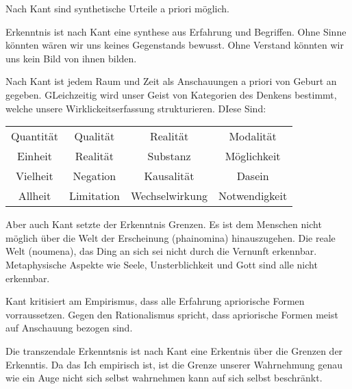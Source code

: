 \documentclass{article}
\begin{document}
Nach Kant sind synthetische Urteile a priori möglich.

Erkenntnis ist nach Kant eine synthese aus Erfahrung und Begriffen. Ohne Sinne könnten wären wir uns keines Gegenstands bewusst.
Ohne Verstand könnten wir uns kein Bild von ihnen bilden.

Nach Kant ist jedem Raum und Zeit als Anschauungen a priori von Geburt an gegeben. GLeichzeitig wird unser Geist von Kategorien des Denkens bestimmt,
welche unsere Wirklickeitserfassung strukturieren. DIese Sind:
\begin{center}
    \begin{tabular} {c c c c}
        Quantität & Qualität & Realität & Modalität \\
        Einheit & Realität & Substanz & Möglichkeit \\
        Vielheit & Negation & Kausalität & Dasein \\
        Allheit & Limitation & Wechselwirkung & Notwendigkeit
    \end{tabular}
\end{center}
Aber auch Kant setzte der Erkenntnis Grenzen. Es ist dem Menschen nicht möglich über die Welt der Erscheinung (phainomina) hinauszugehen.
Die reale Welt (noumena), das Ding an sich sei nicht durch die Vernunft erkennbar. Metaphysische Aspekte wie Seele, Unsterblichkeit und
Gott sind alle nicht erkennbar.

Kant kritisiert am Empirismus, dass alle Erfahrung apriorische Formen vorraussetzen. Gegen den Rationalismus spricht,
dass apriorische Formen meist auf Anschauung bezogen sind.

Die transzendale Erkenntsnis ist nach Kant eine Erkentnis über die Grenzen der Erkenntis. Da das Ich empirisch ist, ist die 
Grenze unserer Wahrnehmung genau wie ein Auge nicht sich selbst wahrnehmen kann auf sich selbst beschränkt.
\end{document}
